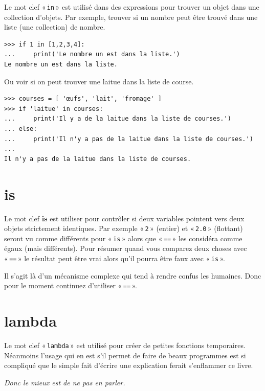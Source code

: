 Le mot clef « \texttt{in} » est utilisé dans des expressions pour trouver un objet dans une collection d'objets. Par exemple, trouver si un nombre peut être trouvé dans une liste (une collection) de nombre.

\begin{Verbatim}[frame=single,rulecolor=\color{gray}]
>>> if 1 in [1,2,3,4]:
...     print('Le nombre un est dans la liste.')
Le nombre un est dans la liste.
\end{Verbatim}

Ou voir si on peut trouver une laitue dans la liste de course.

\begin{Verbatim}[frame=single,rulecolor=\color{gray}]
>>> courses = [ 'œufs', 'lait', 'fromage' ]
>>> if 'laitue' in courses:
...     print('Il y a de la laitue dans la liste de courses.')
... else:
...     print('Il n'y a pas de la laitue dans la liste de courses.')
...
Il n'y a pas de la laitue dans la liste de courses.
\end{Verbatim}

\section*{is}

Le mot clef \textbf{is} est utiliser pour contrôler si deux variables pointent vers deux objets strictement identiques. Par exemple « \texttt{2} » (entier) et « \texttt{2.0} » (flottant) seront vu comme différents pour « \texttt{is} » alors que « \texttt{==} » les considéra comme égaux (mais différents). Pour résumer quand vous comparez deux choses avec « \texttt{==} » le résultat peut être vrai alors qu'il pourra être faux avec  « \texttt{is} ».

Il s'agit là d'un mécanisme complexe qui tend à rendre confus les humaines. Donc pour le moment continuez d'utiliser « \texttt{==} ».

\section*{lambda}

Le mot clef « \texttt{lambda} » est utilisé pour créer de petites fonctions temporaires. Néanmoins l'usage qui en est s'il permet de faire de beaux programmes est si compliqué que le simple fait d'écrire une explication ferait s'enflammer ce livre.

\emph{Donc le mieux est de ne pas en parler.}


